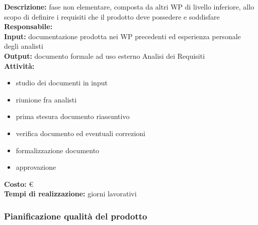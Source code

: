\textbf{Descrizione:} fase non elementare, composta da altri WP di livello inferiore, allo scopo di definire i requisiti che il prodotto deve possedere e soddisfare\\
\linebreak
\textbf{Responsabile:} \\
\linebreak
\textbf{Input:} documentazione prodotta nei WP precedenti ed esperienza personale degli
analisti\\
\linebreak
\textbf{Output:} documento formale ad uso esterno Analisi dei Requisiti\\
\linebreak
\textbf{Attività:}
\begin{itemize}
\item studio dei documenti in input
\item riunione fra analisti
\item prima stesura documento riassuntivo
\item verifica documento ed eventuali correzioni
\item formalizzazione documento
\item approvazione
\end{itemize}
\textbf{Costo:} \euro \\
\textbf{Tempi di realizzazione:}  giorni lavorativi


\subsubsection{Pianificazione qualità del prodotto}

